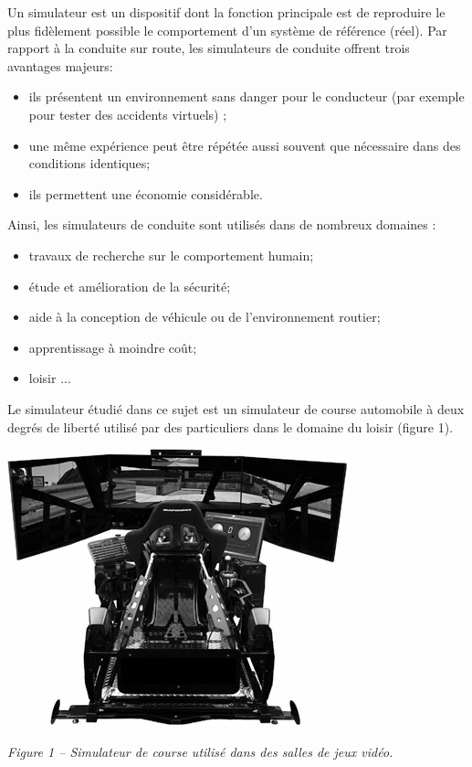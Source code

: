 \documentclass[10pt,fleqn]{article} %
\begin{document}

\vspace{7cm}
\pagestyle{fancy}
\thispagestyle{plain}

\def\columnseprulecolor{\color{ocre}}
\setlength{\columnseprule}{0.4pt} 


Un simulateur est un dispositif dont la fonction principale est de reproduire le plus fidèlement possible le comportement d'un système de référence (réel). 
Par rapport à la conduite sur route, les simulateurs de conduite offrent trois avantages majeurs: 
\begin{itemize}
\item ils présentent un environnement sans danger pour le conducteur (par exemple pour tester des accidents virtuels) ; 
\item une même expérience peut être répétée aussi souvent que nécessaire dans des conditions identiques; 
\item ils permettent une économie considérable. 
\end{itemize}
Ainsi, les simulateurs de conduite sont utilisés dans de nombreux domaines : 
\begin{itemize}
\item travaux de recherche sur le comportement humain; 
\item étude et amélioration de la sécurité; 
\item aide à la conception de véhicule ou de l'environnement routier; 
\item apprentissage à moindre coût; 
\item loisir ... 
\end{itemize}
Le simulateur étudié dans ce sujet est un simulateur de course automobile à deux degrés de liberté utilisé par des particuliers dans le domaine du loisir (figure 1). 


\begin{center}
\includegraphics[width=.45\linewidth]{images/fig_01}

\textit{Figure 1 -- Simulateur de course utilisé dans des salles de jeux vidéo.}
\end{center}
\end{document}
